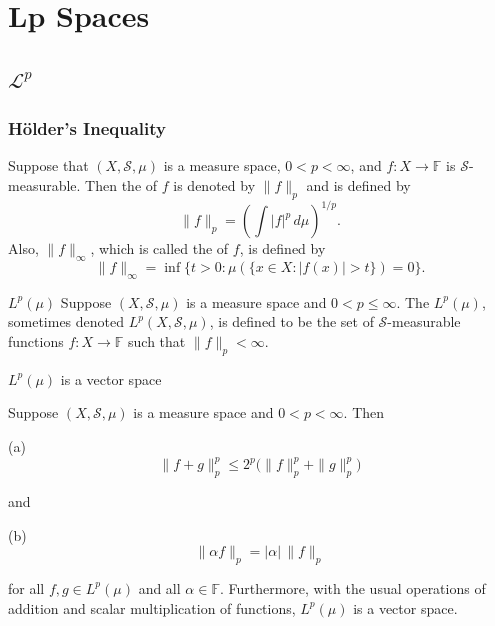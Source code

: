\documentclass[../main.tex]{subfiles}
\begin{document}
\ifSubfilesClassLoaded{

    
}{}

\chapter{ Lp Spaces }

\section{\(  \mathcal{L}^{p}  \) }

\subsection*{H\"older's Inequality}

\begin{definition}{}{}
Suppose that $(X,\mathcal{S},\mu)$ is a measure space, $0 < p < \infty$, and $f \colon X \to \mathbb{F}$ is $\mathcal{S}$-measurable. Then the  of $f$ is denoted by $\|f\|_p$ and is defined by
\[
\|f\|_p = \left( \int |f|^p \, d\mu \right)^{1/p}.
\]
Also, $\|f\|_\infty$, which is called the  of $f$, is defined by
\[
\|f\|_\infty = \operatorname{inf}\{ t > 0 : \mu(\{ x \in X : |f(x)| > t \}) = 0 \}.
\]
\end{definition}
\begin{definition}{$L^p(\mu)$}{}
Suppose $(X,\mathcal{S},\mu)$ is a measure space and $0 < p \leq \infty$. The  $L^p(\mu)$, sometimes denoted $L^p(X,\mathcal{S},\mu)$, is defined to be the set of $\mathcal{S}$-measurable functions $f : X \to \mathbb{F}$ such that $\lVert f \rVert_p < \infty$.
\end{definition}

\begin{theorem}{$L^p(\mu)$ is a vector space}{}

Suppose \((X,\mathcal{S},\mu)\) is a measure space and \(0<p<\infty\). Then

(a)
\[
\|f+g\|_p^p \leq 2^p \bigl(\|f\|_p^p + \|g\|_p^p\bigr)
\]

and

(b)
\[
\|\alpha f\|_p = |\alpha|\,\|f\|_p
\]

for all \(f,g \in L^p(\mu)\) and all \(\alpha \in \mathbb{F}\). Furthermore, with the usual operations of addition and scalar multiplication of functions, \(L^p(\mu)\) is a vector space.
\end{theorem}
\end{document}
